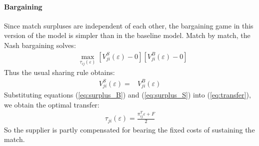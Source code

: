 \documentclass[12pt]{article} \usepackage{amsmath,amssymb,amsthm,geometry,graphicx,setspace,algorithm,algpseudocode,float}
\newcommand{\subsubsubsection}[1]{\paragraph{#1}}
\begin{document}
\subsubsubsection{Bargaining}
Since match surpluses are independent of each other, the bargaining game in this version of the model is simpler than in the baseline model. Match by match, the Nash bargaining solves:
\begin{align}
    & \max_{\tau_{ij}(\varepsilon)} \left[V_{ji}^S(\varepsilon) - 0 \right] \left[ V_{ji}^B(\varepsilon) - 0 \right] 
\end{align}
Thus the usual sharing rule obtains: 
\begin{align} 
    V_{ji}^S(\varepsilon)  = & V_{ji}^B(\varepsilon) 
    \label{eq:transfer}
\end{align}
Substituting equations (\ref{eq:surplus_B}) and (\ref{eq:surplus_S}) into (\ref{eq:transfer}), we obtain the optimal transfer:
\begin{align}
    \tau_{ji}(\varepsilon) = \frac{\pi_{ij}^T \varepsilon + F}{2} 
    \label{eq:opt_transfer}
\end{align}
So the supplier is partly compensated for bearing the fixed costs of sustaining the match. 
\end{document}
